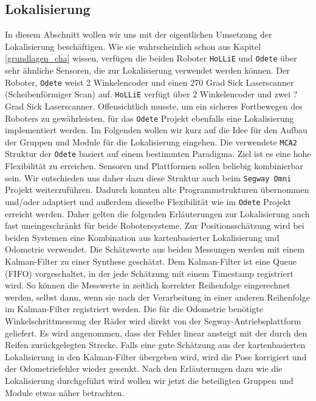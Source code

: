 \subsection{Lokalisierung} 
In diesem Abschnitt wollen wir uns mit der eigentlichen Umsetzung der
 Lokalisierung beschäftigen. Wie sie wahrscheinlich schon aus Kapitel
 \ref{grundlagen_cha} wissen, verfügen die beiden Roboter \lstinline{HoLLiE} und
 \lstinline{Odete} über sehr ähnliche Sensoren, die zur Lokalisierung verwendet
 werden können. Der Roboter, \lstinline{Odete} weist 2 Winkelencoder und einen 270 Grad Sick
 Laserscanner (Scheibenförmiger Scan) auf.
 \lstinline{HoLLiE} verfügt über 2 Winkelencoder und zwei
 ? Grad
 Sick Laserscanner.
 Offensichtlich musste, um ein sicheres Fortbewegen des Roboters zu gewährleisten, für das \lstinline{Odete} Projekt
 ebenfalls eine Lokalisierung implementiert werden.
 Im Folgenden wollen wir kurz auf die Idee für den Aufbau der Gruppen
 und Module für die Lokalisierung eingehen.
 Die verwendete \lstinline{MCA2} Struktur der \lstinline{Odete} basiert auf einem bestimmten
 Paradigma.
 Ziel ist es eine hohe Flexibilität zu erreichen. Sensoren und Plattformen sollen
 beliebig kombinierbar sein. Wir entschieden uns daher dazu diese Struktur auch
 beim \lstinline{Segway Omni} Projekt weiterzuführen. Dadurch konnten alte Programmstrukturen
 übernommen und/oder adaptiert und außerdem dieselbe Flexibilität wie im \lstinline{Odete} Projekt
 erreicht werden. Daher gelten die folgenden Erläuterungen zur Lokalisierung
 auch fast uneingeschränkt für beide Robotersysteme.
 Zur Positionsschätzung wird bei beiden Systemen eine Kombination aus
 kartenbasierter Lokalisierung und Odometrie verwendet. Die Schätzwerte aus beiden Messungen werden mit einem Kalman-Filter zu einer
 Synthese geschätzt. Dem Kalman-Filter ist eine Queue (FIFO) vorgeschaltet, in der jede Schätzung
 mit einem Timestamp registriert wird. So können die Messwerte in zeitlich korrekter Reihenfolge
 eingerechnet werden, selbst dann, wenn sie nach der Verarbeitung in einer anderen Reihenfolge
 im Kalman-Filter registriert werden. Die für die Odometrie benötigte Winkelschrittmessung der Räder wird direkt
 von der Segway-Antriebsplattform geliefert.
 Es wird angenommen, dass der Fehler linear ansteigt mit der durch den Reifen zurückgelegten Strecke.
 Falls eine gute Schätzung aus der kartenbasierten Lokalisierung in den Kalman-Filter übergeben wird,
 wird die Pose korrigiert und der Odometriefehler wieder gesenkt.
 Nach den Erläuterungen dazu wie die Lokalisierung durchgeführt wird wollen wir
 jetzt die beteiligten Gruppen und Module etwas näher betrachten. 

